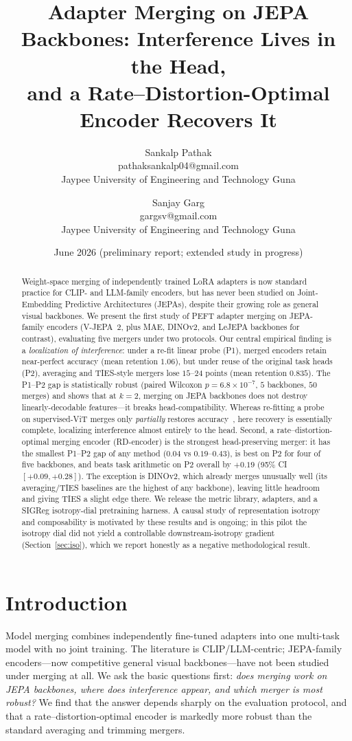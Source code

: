 \documentclass{article}
\title{Adapter Merging on JEPA Backbones: Interference Lives in the Head,\\
\large and a Rate--Distortion-Optimal Encoder Recovers It}
\author{Sankalp Pathak\\ pathaksankalp04@gmail.com \\ Jaypee University of Engineering and Technology Guna \and Sanjay Garg \\ gargsv@gmail.com \\ Jaypee University of Engineering and Technology Guna}
\date{June 2026 \quad (preliminary report; extended study in progress)}
\begin{document}
\maketitle

\begin{abstract}
Weight-space merging of independently trained LoRA adapters is now standard
practice for CLIP- and LLM-family encoders, but has never been studied on
Joint-Embedding Predictive Architectures (JEPAs), despite their growing role
as general visual backbones. We present the first study of PEFT
adapter merging on JEPA-family encoders (V-JEPA~2, plus MAE, DINOv2, and
LeJEPA backbones for contrast), evaluating five mergers under two protocols.
Our central empirical finding is a \emph{localization of interference}: under
a re-fit linear probe (P1), merged encoders retain near-perfect accuracy
(mean retention $1.06$), but under reuse of the original task heads (P2),
averaging and TIES-style mergers lose $15$--$24$ points (mean retention
$0.835$). The P1--P2 gap is statistically robust (paired Wilcoxon
$p=6.8\times10^{-7}$, $5$ backbones, $50$ merges) and shows that at $k{=}2$,
merging on JEPA backbones does not destroy linearly-decodable features---it
breaks head-compatibility. Whereas re-fitting a probe on supervised-ViT
merges only \emph{partially} restores accuracy~\citep{sharma2024nonlocal},
here recovery is essentially complete, localizing interference almost
entirely to the head. Second, a rate--distortion-optimal merging encoder
(RD-encoder) is the strongest head-preserving merger: it has the smallest
P1--P2 gap of any method ($0.04$ vs $0.19$--$0.43$), is best on P2 for four
of five backbones, and beats task arithmetic on P2 overall by $+0.19$ (95\%
CI $[+0.09,+0.28]$). The exception is DINOv2, which already merges
unusually well (its averaging/TIES baselines are the highest of any
backbone), leaving little headroom and giving TIES a slight edge there. We release the metric library, adapters, and a SIGReg
isotropy-dial pretraining harness. A causal study of representation isotropy
and composability is motivated by these results and is ongoing; in this
pilot the isotropy dial did not yield a controllable downstream-isotropy
gradient (Section~\ref{sec:iso}), which we report honestly as a negative
methodological result.
\end{abstract}

\section{Introduction}
Model merging combines independently fine-tuned adapters into one multi-task
model with no joint training. The literature is CLIP/LLM-centric; JEPA-family
encoders---now competitive general visual backbones---have not been studied
under merging at all. We ask the basic questions first: \emph{does merging
work on JEPA backbones, where does interference appear, and which merger is
most robust?} We find that the answer depends sharply on the evaluation
protocol, and that a rate--distortion-optimal encoder is markedly more robust
than the standard averaging and trimming mergers.
\end{document}
